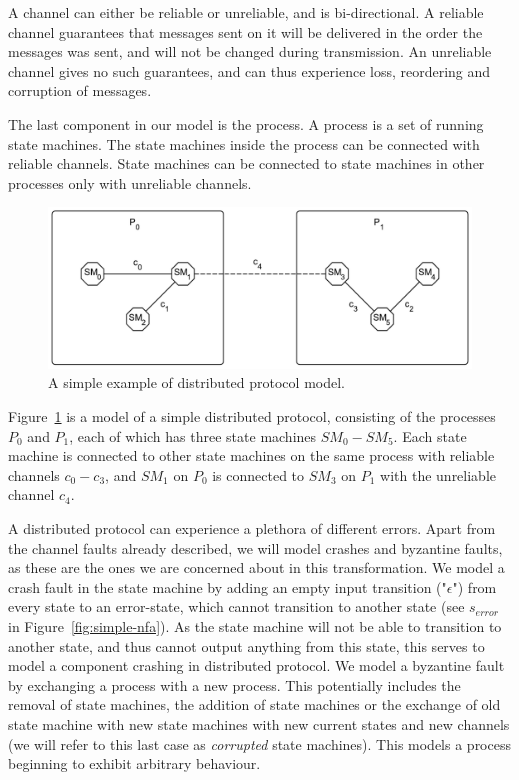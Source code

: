 \documentclass{article}
\begin{document}
	A channel can either be reliable or unreliable, and is bi-directional.
	A reliable channel guarantees that messages sent on it will be delivered in the order the messages was sent, and will not be changed during transmission.
	An unreliable channel gives no such guarantees, and can thus experience loss, reordering and corruption of messages.

	The last component in our model is the process.
	A process is a set of running state machines.
	The state machines inside the process can be connected with reliable channels.
	State machines can be connected to state machines in other processes only with unreliable channels.

	\begin{figure}[ht]
		\center
		\includegraphics[scale=0.6]{figures/state-machines/Distributed-protocol-model.pdf}
		\caption{A simple example of distributed protocol model.\label{fig:simple-model}}
	\end{figure}

	Figure~\ref{fig:simple-model} is a model of a simple distributed protocol, consisting of the processes $P_0$ and $P_1$, each of which has three state machines $SM_0 - SM_5$.
	Each state machine is connected to other state machines on the same process with reliable channels $c_0-c_3$, and $SM_1$ on $P_0$ is connected to $SM_3$ on $P_1$ with the unreliable channel $c_4$.

	A distributed protocol can experience a plethora of different errors.
	Apart from the channel faults already described, we will model crashes and byzantine faults, as these are the ones we are concerned about in this transformation.
	We model a crash fault in the state machine by adding an empty input transition ("$\epsilon$") from every state to an error-state, which cannot transition to another state (see $s_{error}$ in Figure~\ref{fig:simple-nfa}).
	As the state machine will not be able to transition to another state, and thus cannot output anything from this state, this serves to model a component crashing in distributed protocol.
	We model a byzantine fault by exchanging a process with a new process.
	This potentially includes the removal of state machines, the addition of state machines or the exchange of old state machine with new state machines with new current states and new channels (we will refer to this last case as \textit{corrupted} state machines).
	This models a process beginning to exhibit arbitrary behaviour.
\end{document}

